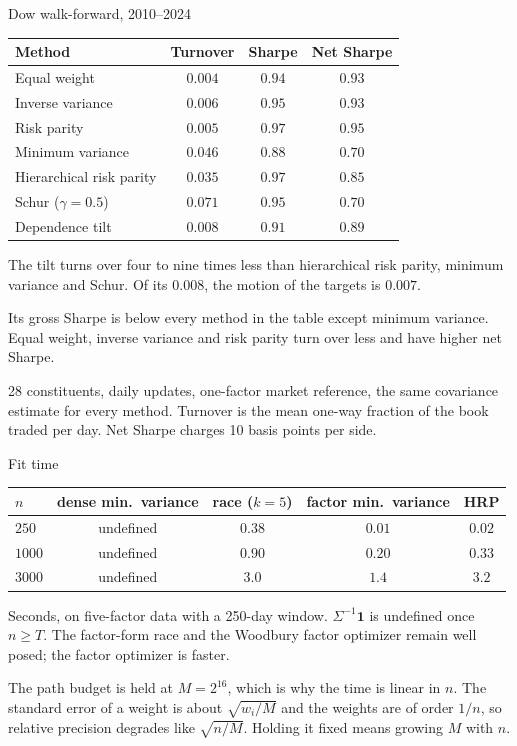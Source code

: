 \documentclass[aspectratio=169,11pt]{beamer}
\newcommand{\one}{\mathbf{1}}
\newcommand{\src}[1]{\par\vfill{\scriptsize\color{gray}#1\par}}
\begin{document}
\begin{frame}{Dow walk-forward, 2010--2024}
\centering
\begin{tabular}{lccc}
  \toprule
  Method & Turnover & Sharpe & Net Sharpe \\
  \midrule
  Equal weight              & $0.004$ & $0.94$ & $0.93$ \\
  Inverse variance          & $0.006$ & $0.95$ & $0.93$ \\
  Risk parity               & $0.005$ & $0.97$ & $0.95$ \\
  Minimum variance          & $0.046$ & $0.88$ & $0.70$ \\
  Hierarchical risk parity  & $0.035$ & $0.97$ & $0.85$ \\
  Schur ($\gamma=0.5$)      & $0.071$ & $0.95$ & $0.70$ \\
  Dependence tilt           & $0.008$ & $0.91$ & $0.89$ \\
  \bottomrule
\end{tabular}

\raggedright
\medskip
The tilt turns over four to nine times less than hierarchical risk parity,
minimum variance and Schur. Of its $0.008$, the motion of the targets is
$0.007$.

Its gross Sharpe is below every method in the table except minimum variance.
Equal weight, inverse variance and risk parity turn over less and have higher
net Sharpe.
\src{28 constituents, daily updates, one-factor market reference, the same
covariance estimate for every method. Turnover is the mean one-way fraction of
the book traded per day. Net Sharpe charges 10 basis points per side.}
\end{frame}

\begin{frame}{Fit time}
\centering
\begin{tabular}{lcccc}
  \toprule
  $n$ & dense min.\ variance & race ($k=5$) & factor min.\ variance & HRP \\
  \midrule
  $250$  & undefined & $0.38$ & $0.01$ & $0.02$ \\
  $1000$ & undefined & $0.90$ & $0.20$ & $0.33$ \\
  $3000$ & undefined & $3.0$  & $1.4$  & $3.2$  \\
  \bottomrule
\end{tabular}

\raggedright
\medskip
Seconds, on five-factor data with a 250-day window. $\Sigma^{-1}\one$ is
undefined once $n\ge T$. The factor-form race and the Woodbury factor optimizer
remain well posed; the factor optimizer is faster.

The path budget is held at $M=2^{16}$, which is why the time is linear in $n$.
The standard error of a weight is about $\sqrt{w_i/M}$ and the weights are of
order $1/n$, so relative precision degrades like $\sqrt{n/M}$. Holding it fixed
means growing $M$ with $n$.
\end{frame}
\end{document}
